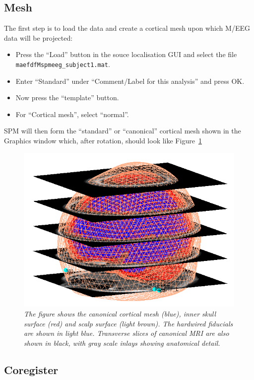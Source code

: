 \subsection{Mesh}
The first step is to load the data and create a cortical mesh upon which M/EEG data will be projected:
\begin{itemize}
\item{Press the ``Load'' button in the souce localisation GUI and select the file \texttt{maefdfMspmeeg\_subject1.mat}.}
\item{Enter ``Standard'' under ``Comment/Label for this analysis'' and press OK.}
\item{Now press the ``template'' button.}
\item{For ``Cortical mesh'', select ``normal''.}
\end{itemize}
SPM will then form the ``standard'' or ``canonical'' cortical mesh shown in the Graphics window which, after rotation, should look like Figure~\ref{mesh}
\begin{figure}
\begin{center}
\includegraphics[width=120mm]{mmn/mesh}
\caption{\em The figure shows the canonical cortical mesh (blue), inner skull surface (red) and scalp surface (light brown). The hardwired fiducials are shown in light blue. Transverse slices of canonical MRI are also shown in black, with gray scale inlays showing anatomical detail.
\label{mesh}}
\end{center}
\end{figure}

\subsection{Coregister}

